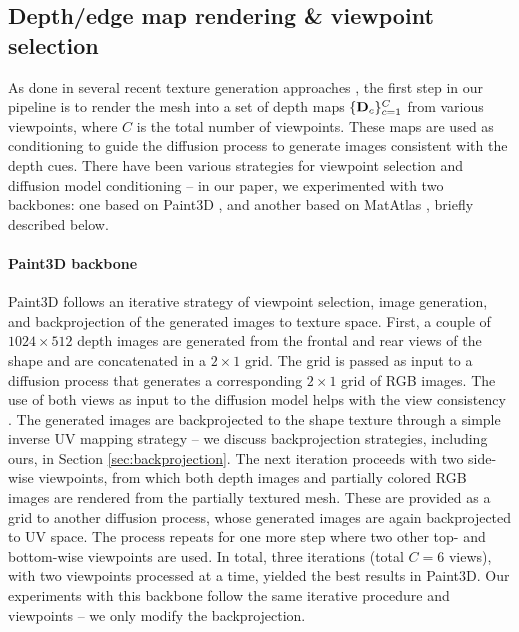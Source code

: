 \subsection{Depth/edge map rendering \& viewpoint selection} 
\label{subsec:backbones}
As done in several recent texture generation approaches \cite{Zeng:2024:Paint3D, Liu:2024:SyncMVD, Ceylan:2024:Matatlas, Cheng:2024:MVPaint}, the first step in our pipeline is to render the mesh into a set of depth maps
$\{\mathbf{D}_c\}_{c=1}^C$ from various viewpoints,
where $C$ is the total number of viewpoints. These maps are used as conditioning to guide the diffusion process to generate images consistent with the depth cues.
There have been various strategies for viewpoint selection and diffusion model conditioning -- in our paper, we experimented with two backbones: one based on Paint3D \cite{Zeng:2024:Paint3D}, and another based on MatAtlas \cite{Ceylan:2024:Matatlas}, briefly described below. 

\paragraph{Paint3D backbone}
 Paint3D follows an iterative strategy of viewpoint selection, image generation, and backprojection of the generated images to texture space.  
  First, a couple of $1024 \times 512$ depth images are generated from the frontal and rear views of the shape and are concatenated in a $2\times1$ grid. The grid is passed as input to a diffusion process that generates a corresponding $2\times1$ grid of RGB images. The use of both views as input to the diffusion model
  helps with the view consistency \cite{Zeng:2024:Paint3D}.
  The generated images are backprojected to the shape texture through a simple inverse UV mapping strategy -- we discuss backprojection strategies, including ours, in Section \ref{sec:backprojection}. 
The next iteration proceeds with two side-wise viewpoints, from which both depth images and partially colored RGB images are rendered from the partially textured mesh. These are provided as a grid to another diffusion process, whose generated images are again backprojected to UV space. The process repeats for one more step where two other top- and bottom-wise viewpoints are used. In total, three iterations (total $C=6$ views), 
with two viewpoints processed at a time, yielded the best results in Paint3D. Our experiments with this backbone follow the same iterative procedure and viewpoints -- we only modify the backprojection. 

